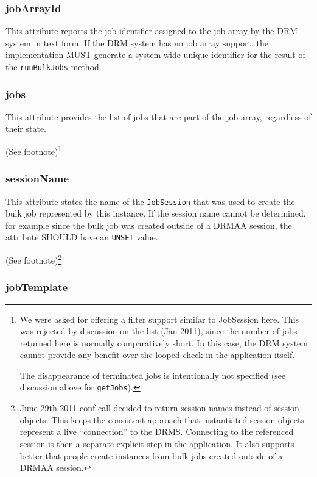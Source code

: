 \documentclass{article}
\newcommand{\h}[1]{\lstinline|#1|}
\newcommand{\rat}[1]{ {\tiny(See footnote)}\footnote{#1} }
\begin{document}
\subsubsection{jobArrayId}

This attribute reports the job identifier assigned to the job array by the DRM system in text form. If the DRM system has no job array support, the implementation MUST generate a system-wide unique identifier for the result of the \h{runBulkJobs} method.

\subsubsection{jobs}

This attribute provides the list of jobs that are part of the job array, regardless of their state. 

\rat{
We were asked for offering a filter support similar to JobSession here. This was rejected by discussion on the list (Jan 2011), since the number of jobs returned here is normally comparatively short. In this case, the DRM system cannot provide any benefit over the looped check in the application itself.

The disappearance of terminated jobs is intentionally not specified (see discussion above for \h{getJobs}).
}

\subsubsection{sessionName}

This attribute states the name of the \h{JobSession} that was used to create the bulk job represented by this instance. If the session name cannot be determined, for example since the bulk job was created outside of a DRMAA session, the attribute SHOULD have an \h{UNSET} value.

\rat{June 29th 2011 conf call decided to return session names instead of session objects. This keeps the consistent approach that instantiated session objects represent a live ``connection'' to the DRMS. Connecting to the referenced session is then a separate explicit step in the application. It also supports better that people create instances from bulk jobs created outside of a DRMAA session.
}

\subsubsection{jobTemplate}
\end{document}
